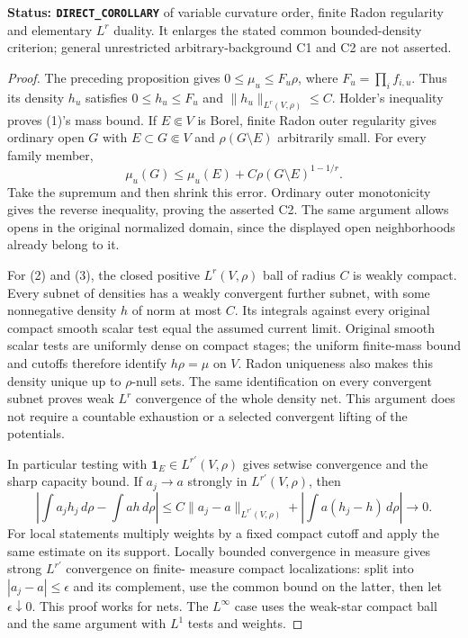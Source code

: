 \documentclass[11pt,a4paper]{article}
\numberwithin{equation}{section}
\theoremstyle{definition}
\theoremstyle{remark}
\begin{document}
\noindent\textbf{Status: \texttt{DIRECT\_COROLLARY}} of variable
curvature order, finite Radon regularity and elementary $L^r$ duality.
It enlarges the stated common bounded-density criterion; general
unrestricted arbitrary-background C1 and C2 are not asserted.

\begin{proof}
The preceding proposition gives
$0\le\mu_u\le F_u\rho$, where $F_u=\prod_i f_{i,u}$.
Thus its density $h_u$ satisfies $0\le h_u\le F_u$ and
$\|h_u\|_{L^r(V,\rho)}\le C$. Holder's inequality proves (1)'s
mass bound. If $E\Subset V$ is Borel, finite Radon outer regularity
gives ordinary open $G$ with $E\subset G\Subset V$ and
$\rho(G\setminus E)$ arbitrarily small. For every family member,
\[
      \mu_u(G)\le\mu_u(E)+C\rho(G\setminus E)^{1-1/r}.
\]
Take the supremum and then shrink this error. Ordinary outer
monotonicity gives the reverse inequality, proving the asserted C2.
The same argument allows opens in the original normalized domain,
since the displayed open neighborhoods already belong to it.

For (2) and (3), the closed positive $L^r(V,\rho)$ ball of radius
$C$ is weakly compact. Every subnet of densities has a weakly
convergent further subnet, with some nonnegative density $h$ of
norm at most $C$. Its integrals against every original compact
smooth scalar test equal the assumed current limit. Original smooth
scalar tests are uniformly dense on compact stages; the uniform
finite-mass bound and cutoffs therefore identify $h\rho=\mu$ on
$V$. Radon uniqueness also makes this density unique up to
$\rho$-null sets. The same identification on every convergent
subnet proves weak $L^r$ convergence of the whole density net.
This argument does not require a countable exhaustion or a selected
convergent lifting of the potentials.

In particular testing with $\mathbf1_E\in L^{r'}(V,\rho)$ gives
setwise convergence and the sharp capacity bound. If $a_j\to a$
strongly in $L^{r'}(V,\rho)$, then
\[
 \left|\int a_jh_j\,d\rho-\int ah\,d\rho\right|
 \le C\|a_j-a\|_{L^{r'}(V,\rho)}
                 +\left|\int a(h_j-h)\,d\rho\right|\longrightarrow0.
\]
For local statements multiply weights by a fixed compact cutoff
and apply the same estimate on its support. Locally bounded
convergence in measure gives strong $L^{r'}$ convergence on finite-
measure compact localizations: split into $|a_j-a|\le\epsilon$
and its complement, use the common bound on the latter, then let
$\epsilon\downarrow0$. This proof works for nets. The $L^\infty$
case uses the weak-star compact ball and the same argument with
$L^1$ tests and weights.
\end{proof}
\end{document}
